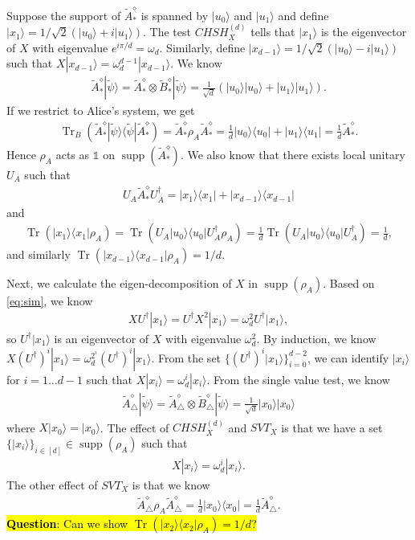 \documentclass[11pt,letterpaper]{article}
\newcommand{\ket}[1]{|#1\rangle}
\newcommand{\ketbra}[2]{|#1\rangle\langle#2|}
\newcommand{\x}{\otimes}
\DeclareMathOperator{\Tr}{Tr}
\DeclareMathOperator{\supp}{supp}
\newcommand{\1}{\mathbb{1}}
\newcommand{\CHSH}{CHSH^{(d)}}
\newcommand{\SVT}{SVT}
\newcommand{\tA}{\tilde{A}}
\newcommand{\tB}{\tilde{B}}
\newcommand{\tpsi}{\tilde{\psi}}
\theoremstyle{definition}
\begin{document}
Suppose the support of $\tA_\ast^\diamond$ is spanned by $\ket{u_0}$ and $\ket{u_1}$ and 
define $\ket{x_1} = 1/\sqrt{2}(\ket{u_0} + i\ket{u_1})$. 
The test $\CHSH_X$ tells that $\ket{x_1}$ is the eigenvector of $X$ with eigenvalue $e^{i\pi/d} = \omega_d$.
Similarly, define $\ket{x_{d-1}} = 1/\sqrt{2}(\ket{u_0} - i\ket{u_1})$ such that $X \ket{x_{d-1}} = \omega_d^{d-1}\ket{x_{d-1}}$.
We know 
\begin{align}
	\tA_\ast^\diamond \ket{\tpsi} = \tA_\ast^\diamond \x \tB_\ast^\diamond \ket{\tpsi} = \frac{1}{\sqrt{d}} (\ket{u_0}\ket{u_0} + \ket{u_1}\ket{u_1}).
\end{align}
If we restrict to Alice's system, we get 
\begin{align}
	\Tr_B(\tA_\ast^\diamond \ketbra{\tpsi}{\tpsi} \tA_\ast^\diamond) =\tA_\ast^\diamond \rho_A \tA_\ast^\diamond = 
 \frac{1}{d} \ketbra{u_0}{u_0} + \ketbra{u_1}{u_1} = \frac{1}{d} \tA_\ast^\diamond.
\end{align}
Hence $\rho_A$ acts as $\1$ on $\supp(\tA_\ast^\diamond)$.
We also know that there exists local unitary $U_A$ such that 
\begin{align}
U_A \tA_\ast^\diamond U_A^\dagger = \ketbra{x_1}{x_1}+\ketbra{x_{d-1}}{x_{d-1}}
\end{align}
and 
\begin{align}
\Tr(\ketbra{x_1}{x_1} \rho_A)
=\Tr(U_A \ketbra{u_0}{u_0} U_A^\dagger \rho_A) 
= \frac{1}{d} \Tr(U_A\ketbra{u_0}{u_0} U_A^\dagger) 
= \frac{1}{d},
\end{align}
and similarly $\Tr( \ketbra{x_{d-1}}{x_{d-1}}\rho_A) = 1/d$.

Next, we calculate the eigen-decomposition of $X$ in $\supp(\rho_A)$.
Based on \cref{eq:sim}, we know
\begin{align}
\label{eq:ladder}
 XU^\dagger \ket{x_1} = U^\dagger X^2 \ket{x_1} = \omega_d^2 U^\dagger \ket{x_1},
\end{align}
so $U^\dagger \ket{x_1}$ is an eigenvector of $X$ with eigenvalue $\omega_d^2$.
By induction, we know $X (U^\dagger)^i \ket{x_1} = \omega_d^{2^i} (U^\dagger)^i\ket{x_1}$. 
From the set $\{(U^\dagger)^i \ket{x_1}\}_{i=0}^{d-2}$, we can identify $\ket{x_i}$ for $i = 1 \dots  d-1$
such that $X \ket{x_i} = \omega_d^i \ket{x_i}$.
From the single value test, we know 
\begin{align}
	\tA_\triangle^\diamond \ket{\tpsi} = \tA_\triangle^\diamond \x \tB_\triangle^\diamond \ket{\tpsi} = \frac{1}{\sqrt{d}}
	\ket{x_0}\ket{x_0}
\end{align}
where $X \ket{x_0} = \ket{x_0}$. 
The effect of $\CHSH_X$ and $\SVT_X$ is that we have a set $\{ \ket{x_i} \}_{i \in [d]} \in \supp(\rho_A)$ such that
\begin{align}
	X \ket{x_i} = \omega_d^i \ket{x_i}.
\end{align}
The other effect of $\SVT_X$ is that we know 
\begin{align}
	\tA_\triangle^\diamond \rho_A \tA_\triangle^\diamond = \frac{1}{d} \ketbra{x_0}{x_0} = \frac{1}{d} \tA_\triangle^\diamond.
\end{align}
\hl{\textbf{Question}: Can we show $\Tr(\ketbra{x_2}{x_2} \rho_A) = 1/d$?}
\end{document}
